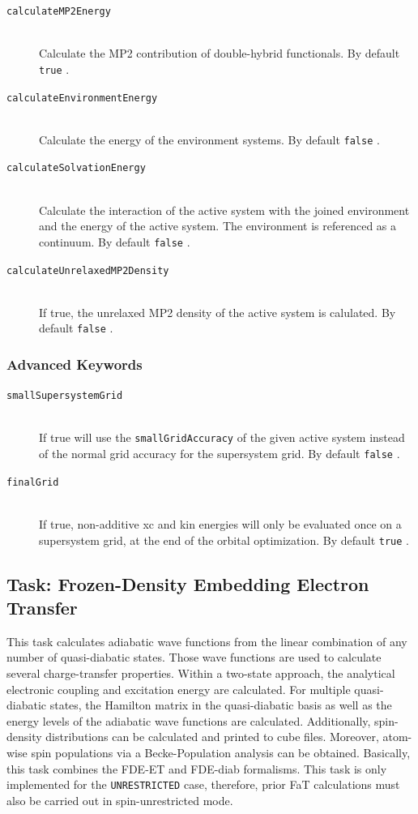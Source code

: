 \documentclass[bibliography=totocnumbered,a4paper,10pt,oneside]{scrbook}
\newcommand{\ttt}[1]{%
  \begingroup\setlength{\fboxsep}{1pt}%
  \colorbox{serenity-green!30}{\texttt{\hspace*{2pt}\vphantom{(g}#1\hspace*{2pt}}}%
  \endgroup
}
\begin{document}
\begin{description}
	\item [\texttt{calculateMP2Energy}] \hfill \\
	Calculate the MP2 contribution of double-hybrid functionals. By default \ttt{true}.
	\item [\texttt{calculateEnvironmentEnergy}] \hfill \\
	Calculate the energy of the environment systems. By default \ttt{false}.
	\item [\texttt{calculateSolvationEnergy}] \hfill \\
	Calculate the interaction of the active system with the joined environment and the energy of the active system. The environment is referenced
	as a continuum. By default \ttt{false}.
  \item[\texttt{calculateUnrelaxedMP2Density}]\hfill \\
  If true, the unrelaxed MP2 density of the active system is calulated. By default \ttt{false}.
\end{description}

\subsubsection{Advanced Keywords}
\begin{description}
	\item [\texttt{smallSupersystemGrid}]\hfill \\
	If true will use the \ttt{smallGridAccuracy} of the given active system instead of the normal grid accuracy for the supersystem grid. By default \ttt{false}.
	\item [\texttt{finalGrid}]\hfill \\
	If true, non-additive xc and kin energies will only be evaluated once on a supersystem grid, at the end of the orbital optimization. By default \ttt{true}.
\end{description}

\subsection{Task: Frozen-Density Embedding Electron Transfer}

This task calculates adiabatic wave functions from the linear combination of any number of quasi-diabatic states.
Those wave functions are used to calculate several charge-transfer properties. Within a two-state approach, the
analytical electronic coupling and  excitation energy are calculated. For multiple quasi-diabatic states, the Hamilton
matrix in the quasi-diabatic basis as well as the energy levels of the adiabatic wave functions are calculated.
Additionally, spin-density distributions can be calculated and printed to cube files. Moreover, atom-wise spin
populations via a Becke-Population analysis can be obtained. Basically, this task combines the FDE-ET and FDE-diab
formalisms. This task is only implemented for the \ttt{UNRESTRICTED} case, therefore, prior FaT calculations must also be
carried out in spin-unrestricted mode.
\end{document}
